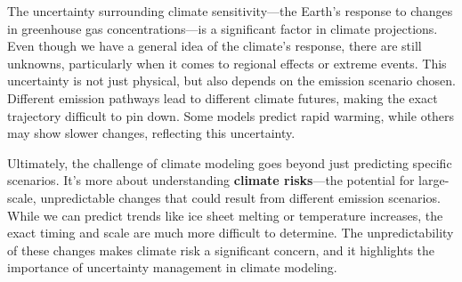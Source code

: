 The uncertainty surrounding climate sensitivity—the Earth's response to changes in greenhouse gas concentrations—is a significant factor in climate projections. Even though we have a general idea of the climate's response, there are still unknowns, particularly when it comes to regional effects or extreme events. This uncertainty is not just physical, but also depends on the emission scenario chosen. Different emission pathways lead to different climate futures, making the exact trajectory difficult to pin down. Some models predict rapid warming, while others may show slower changes, reflecting this uncertainty.



Ultimately, the challenge of climate modeling goes beyond just predicting specific scenarios. It's more about understanding \textbf{climate risks}—the potential for large-scale, unpredictable changes that could result from different emission scenarios. While we can predict trends like ice sheet melting or temperature increases, the exact timing and scale are much more difficult to determine. The unpredictability of these changes makes climate risk a significant concern, and it highlights the importance of uncertainty management in climate modeling.


 
